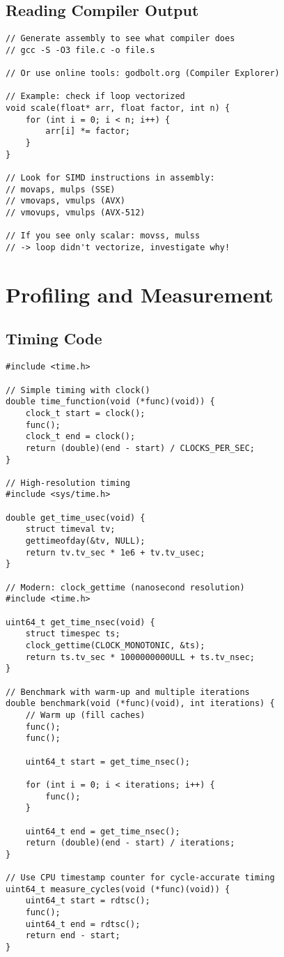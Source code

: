 \subsection{Reading Compiler Output}

\begin{lstlisting}
// Generate assembly to see what compiler does
// gcc -S -O3 file.c -o file.s

// Or use online tools: godbolt.org (Compiler Explorer)

// Example: check if loop vectorized
void scale(float* arr, float factor, int n) {
    for (int i = 0; i < n; i++) {
        arr[i] *= factor;
    }
}

// Look for SIMD instructions in assembly:
// movaps, mulps (SSE)
// vmovaps, vmulps (AVX)
// vmovups, vmulps (AVX-512)

// If you see only scalar: movss, mulss
// -> loop didn't vectorize, investigate why!
\end{lstlisting}

\section{Profiling and Measurement}

\subsection{Timing Code}

\begin{lstlisting}
#include <time.h>

// Simple timing with clock()
double time_function(void (*func)(void)) {
    clock_t start = clock();
    func();
    clock_t end = clock();
    return (double)(end - start) / CLOCKS_PER_SEC;
}

// High-resolution timing
#include <sys/time.h>

double get_time_usec(void) {
    struct timeval tv;
    gettimeofday(&tv, NULL);
    return tv.tv_sec * 1e6 + tv.tv_usec;
}

// Modern: clock_gettime (nanosecond resolution)
#include <time.h>

uint64_t get_time_nsec(void) {
    struct timespec ts;
    clock_gettime(CLOCK_MONOTONIC, &ts);
    return ts.tv_sec * 1000000000ULL + ts.tv_nsec;
}

// Benchmark with warm-up and multiple iterations
double benchmark(void (*func)(void), int iterations) {
    // Warm up (fill caches)
    func();
    func();

    uint64_t start = get_time_nsec();

    for (int i = 0; i < iterations; i++) {
        func();
    }

    uint64_t end = get_time_nsec();
    return (double)(end - start) / iterations;
}

// Use CPU timestamp counter for cycle-accurate timing
uint64_t measure_cycles(void (*func)(void)) {
    uint64_t start = rdtsc();
    func();
    uint64_t end = rdtsc();
    return end - start;
}
\end{lstlisting}


